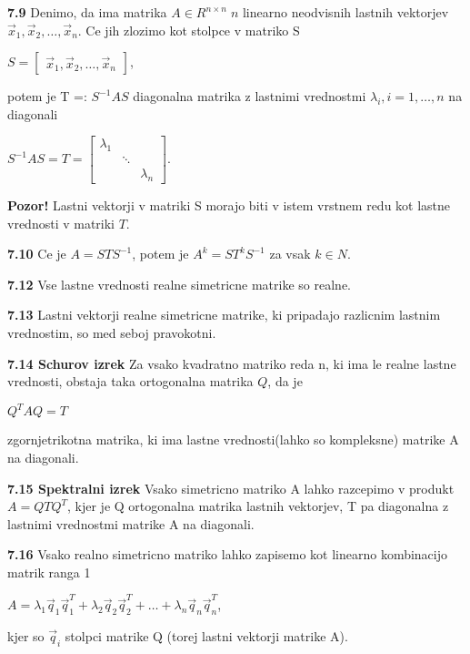 \documentclass{article}
\begin{document}
\begin{multicols}{2}
\textbf{7.9} Denimo, da ima matrika $A \in R^{n \times n}\; n$ linearno neodvisnih lastnih vektorjev
$\vec{x}_{1}, \vec{x}_{2}, \dots, \vec{x}_{n}$. Ce jih zlozimo kot stolpce v matriko S
\begin{center}
	\begin{math}
		S =
		\begin{bmatrix}
			\vec{x}_{1}, \vec{x}_{2}, \dots, \vec{x}_{n}
		\end{bmatrix}
	\end{math},
\end{center}
potem je T =: $S^{-1}AS$ diagonalna matrika z lastnimi vrednostmi $\lambda_{i}, i = 1, \dots, n$ na diagonali
\begin{center}
	\begin{math}
		S^{-1}AS = T =
		\begin{bmatrix}
			\lambda_{1} &        &             \\
			            & \ddots &             \\
			            &        & \lambda_{n}
		\end{bmatrix}
	\end{math}.
\end{center}

\textbf{Pozor!} Lastni vektorji v matriki S morajo biti v istem vrstnem redu kot lastne vrednosti v matriki $T$.

\textbf{7.10} Ce je $A = STS^{-1}$, potem je $A^{k} = ST^{k}S^{-1}$ za vsak $k \in N$.

\textbf{7.12} Vse lastne vrednosti realne simetricne matrike so realne.

\textbf{7.13} Lastni vektorji realne simetricne matrike, ki pripadajo razlicnim lastnim
vrednostim, so med seboj pravokotni.

\textbf{7.14 Schurov izrek} Za vsako kvadratno matriko reda n, ki ima le realne lastne vrednosti,
obstaja taka ortogonalna matrika $Q$, da je
\begin{center}
	\begin{math}
		Q^{T}AQ = T
	\end{math}
\end{center}
zgornjetrikotna matrika, ki ima lastne vrednosti(lahko so kompleksne) matrike A na diagonali.

\textbf{7.15 Spektralni izrek} Vsako simetricno matriko A lahko razcepimo v produkt
$A = QTQ^{T}$, kjer je Q ortogonalna matrika lastnih vektorjev, T pa diagonalna z lastnimi
vrednostmi matrike A na diagonali.

\textbf{7.16} Vsako realno simetricno matriko lahko zapisemo kot linearno kombinacijo matrik ranga 1
\begin{center}
	\begin{math}
		A = \lambda_{1}\vec{q}_{1}\vec{q}_{1}^{T} + \lambda_{2}\vec{q}_{2}\vec{q}_{2}^{T} +
		\dots + \lambda_{n}\vec{q}_{n}\vec{q}_{n}^{T}
	\end{math},
\end{center}
kjer so $\vec{q}_{i}$ stolpci matrike Q (torej lastni vektorji matrike A).


\end{multicols}
\end{document}

